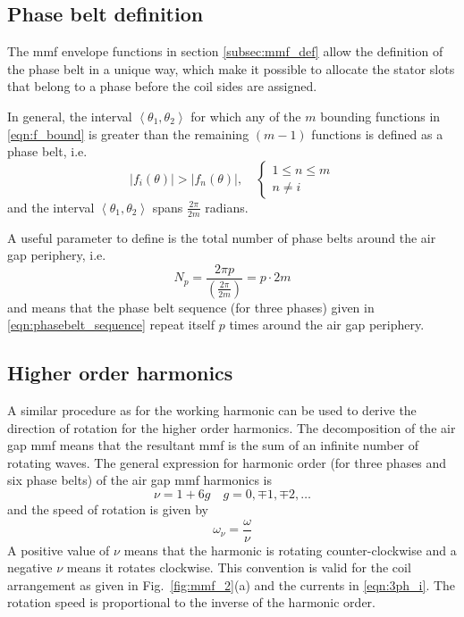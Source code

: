 \subsection{Phase belt definition}\label{subsec:phasebelt_def}
The mmf envelope functions in section \ref{subsec:mmf_def} allow the definition of the phase belt in a unique way, which make it possible to allocate the stator slots that belong to a phase before the coil sides are assigned. 
\begin{defth}
In general, the interval $\left\langle \theta_1,\theta_2 \right\rangle$ for which any of the $m$ bounding functions in \eqref{eqn:f_bound} is greater than the remaining $(m-1)$ functions is defined as a phase belt, i.e. 
\begin{equation}
 \left|f_i(\theta)\right| > \left|f_n(\theta)\right|, \quad
 \begin{cases}
   1 \leq n \leq m \\
   n \neq i
 \end{cases}
\end{equation}
and the interval $\left\langle \theta_1,\theta_2 \right\rangle$ spans $\frac{2\pi}{2m}$ radians. 
\end{defth}
A useful parameter to define is the total number of phase belts around the air gap periphery, i.e. 
\begin{equation}
  \label{eqn:Np}
  N_p = \frac{2\pi p}{\left(\frac{2\pi}{2m}\right)}=p\cdot2m
\end{equation}
and means that the phase belt sequence (for three phases) given in \eqref{eqn:phasebelt_sequence} repeat itself $p$ times around the air gap periphery.

\subsection{Higher order harmonics}
A similar procedure as for the working harmonic can be used to derive the direction of rotation for the higher order harmonics. The decomposition of the air gap mmf means that the resultant mmf is the sum of an infinite number of rotating waves. The general expression for harmonic order (for three phases and six phase belts) of the air gap mmf harmonics is
\begin{equation}
  \label{eqn:harm_oder}
  \nu = 1+6g \quad g=0,\mp1,\mp2,\ldots
\end{equation}
and the speed of rotation is given by 
\begin{equation}
  \omega_{\nu} = \frac{\omega}{\nu}
\end{equation}
A positive value of $\nu$ means that the harmonic is rotating counter-clockwise and a negative $\nu$ means it rotates clockwise. This convention is valid for the coil arrangement as given in Fig.~\ref{fig:mmf_2}(a) and the currents in \eqref{eqn:3ph_i}. The rotation speed is proportional to the inverse of the harmonic order.

